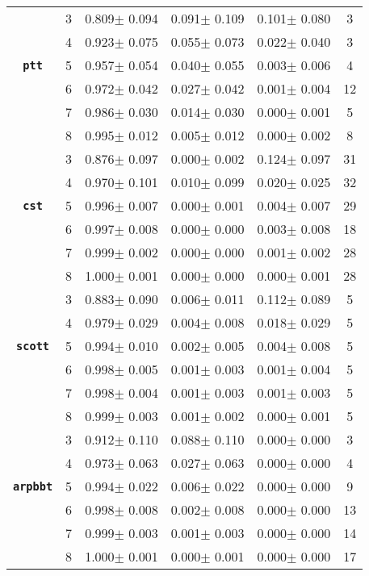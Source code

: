 \begin{table}[h]
\begin{tabular}{cccccc}
     & 3 & 0.809$\pm$	0.094&	0.091$\pm$	0.109&	0.101$\pm$	0.080&	3\\
     & 4 & 0.923$\pm$	0.075&	0.055$\pm$	0.073&	0.022$\pm$	0.040&	3\\
     \textbf{\texttt{ptt}}& 5 & 0.957$\pm$	0.054&	0.040$\pm$	0.055&	0.003$\pm$	0.006&	4\\
     & 6 & 0.972$\pm$	0.042&	0.027$\pm$	0.042&	0.001$\pm$	0.004&	12\\
     & 7 & 0.986$\pm$	0.030&	0.014$\pm$	0.030&	0.000$\pm$	0.001&	5\\
     & 8 & 0.995$\pm$	0.012&	0.005$\pm$	0.012&	0.000$\pm$	0.002&	8\\
     \midrule
     & 3 & 0.876$\pm$	0.097&	0.000$\pm$	0.002&	0.124$\pm$	0.097&	31\\
     & 4 & 0.970$\pm$	0.101&	0.010$\pm$	0.099&	0.020$\pm$	0.025&	32\\
     \textbf{\texttt{cst}}& 5 & 0.996$\pm$	0.007&	0.000$\pm$	0.001&	0.004$\pm$	0.007&	29\\
     & 6 & 0.997$\pm$	0.008&	0.000$\pm$	0.000&	0.003$\pm$	0.008&	18\\
     & 7 & 0.999$\pm$	0.002&	0.000$\pm$	0.000&	0.001$\pm$	0.002&	28\\
     & 8 & 1.000$\pm$	0.001&	0.000$\pm$	0.000&	0.000$\pm$	0.001&	28\\
     \midrule
     & 3 & 0.883$\pm$	0.090&	0.006$\pm$	0.011&	0.112$\pm$	0.089&	5\\
     & 4 & 0.979$\pm$	0.029&	0.004$\pm$	0.008&	0.018$\pm$	0.029&	5\\
     \textbf{\texttt{scott}}& 5 & 0.994$\pm$	0.010&	0.002$\pm$	0.005&	0.004$\pm$	0.008&	5\\
     & 6 & 0.998$\pm$	0.005&	0.001$\pm$	0.003&	0.001$\pm$	0.004&	5\\
     & 7 & 0.998$\pm$	0.004&	0.001$\pm$	0.003&	0.001$\pm$	0.003&	5\\
     & 8 & 0.999$\pm$	0.003&	0.001$\pm$	0.002&	0.000$\pm$	0.001&	5\\
     \midrule
     & 3 & 0.912$\pm$	0.110&	0.088$\pm$	0.110&	0.000$\pm$	0.000&	3\\
     & 4 & 0.973$\pm$	0.063&	0.027$\pm$	0.063&	0.000$\pm$	0.000&	4\\
     \textbf{\texttt{arpbbt}}& 5 & 0.994$\pm$	0.022&	0.006$\pm$	0.022&	0.000$\pm$	0.000&	9\\
     & 6 & 0.998$\pm$	0.008&	0.002$\pm$	0.008&	0.000$\pm$	0.000&	13\\
     & 7 & 0.999$\pm$	0.003&	0.001$\pm$	0.003&	0.000$\pm$	0.000&	14\\
     & 8 & 1.000$\pm$	0.001&	0.000$\pm$	0.001&	0.000$\pm$	0.000&	17\\
     \bottomrule
    \end{tabular}
\end{table}






